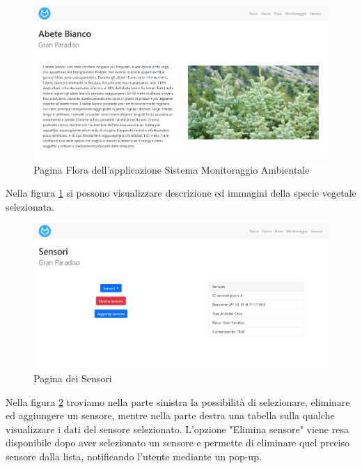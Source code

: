 \newpage
\begin{figure}[ht]   
\centering
\includegraphics[scale=0.45]{Img/Flora.png}
    \caption{Pagina Flora dell'applicazione Sistema Monitoraggio Ambientale}
    \label{flora}
\end{figure}

Nella figura \ref{flora} si possono visualizzare descrizione ed immagini della specie vegetale selezionata.

\begin{figure}[ht]   
\centering
\includegraphics[scale=0.45]{Img/Sensori.png}
    \caption{Pagina dei Sensori}
    \label{sensorilista}
\end{figure}

Nella figura \ref{sensorilista} troviamo nella parte sinistra la possibilità di selezionare, eliminare
ed aggiungere un sensore, mentre nella parte destra una tabella sulla qualche visualizzare i dati del sensore selezionato.
\noindent
L'opzione "Elimina sensore" viene resa disponibile dopo aver selezionato un sensore e permette di eliminare quel preciso sensore dalla lista, notificando l'utente mediante un pop-up.

